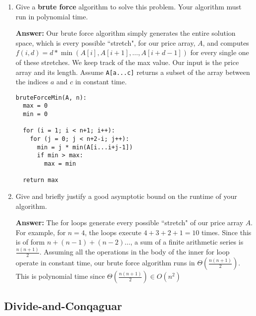 \documentclass[11pt, oneside]{article}   	%
\theoremstyle{definition}
\theoremstyle{remark}
\begin{document}
\begin{enumerate}
\item Give a \textbf{brute force} algorithm to solve this problem. Your algorithm
   must run in polynomial time.
   
   \textbf{Answer:} Our brute force algorithm simply generates the entire solution space, which is every possible ``stretch", for our price array, $A$, and computes $f(i,d) =
d*\min(A[i],A[i+1],\ldots,A[i+d-1])$ for every single one of these stretches. We keep track of the max value. Our input is the price array and its length. Assume \texttt{A[a...c]} returns a subset of the array between the indices $a$ and $c$ in constant time. 
\begin{verbatim}
bruteForceMin(A, n):
  max = 0
  min = 0
  
  for (i = 1; i < n+1; i++): 
    for (j = 0; j < n+2-i; j++):
      min = j * min(A[i...i+j-1])
      if min > max:
        max = min
       
  return max		
\end{verbatim}

\item Give and briefly justify a good asymptotic bound on the runtime of
   your algorithm.
   
   \textbf{Answer: } The for loops generate every possible ``stretch" of our price array $A$. For example, for $n=4$, the loops execute $4 + 3 + 2 + 1 = 10$ times. Since this is of form $n+(n-1)+(n-2)\ldots$, a sum of a finite arithmetic series is $\frac{n(n+1)}{2}$. Assuming all the operations in the body of the inner for loop operate in constant time, our brute force algorithm runs in $\Theta(\frac{n(n+1)}{2})$. This is polynomial time since $\Theta(\frac{n(n+1)}{2}) \in O(n^2)$
\end{enumerate}
\subsection{Divide-and-Conqaguar}
\label{sec-1-1}
\end{document}

